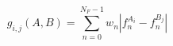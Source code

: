 \begin{equation}
g_{i,j}(A,B) = \sum_{n=0}^{N_F-1} w_n | f_n^{A_i} - f_n^{B_j} |
\label{eq:feature_block_distance}
\end{equation}
